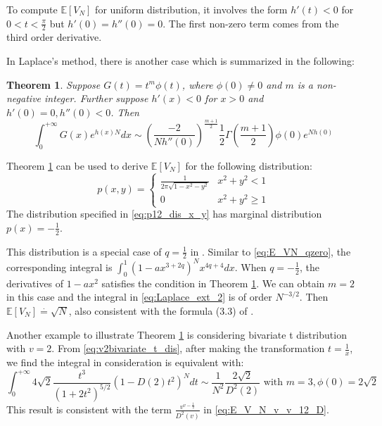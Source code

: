 \documentclass{article}
\newtheorem{theorem}{Theorem}
\def\E{\mathbb{E}}
\begin{document}
To compute $\E[V_N]$ for uniform distribution,
it involves the form $h'(t)<0$ for $0<t<\frac{\pi}{2}$
but $h'(0)=h''(0)=0$. The first non-zero term comes from
the third order derivative.

In Laplace's method, there is another case which is summarized in the following:
\begin{theorem}\label{thm:second_derivative_laplace}
    Suppose $G(t) = t^{m} \phi(t)$, where $\phi(0)\neq 0$
    and $m$ is a non-negative integer.
    Further suppose $h'(x)<0$ for $x> 0$ and $h'(0)=0, h''(0)<0$.
    Then
    \begin{equation}\label{eq:Laplace_ext_2}
        \int_0^{+\infty} G(x) e^{h(x)N} dx
        \sim \left(\frac{-2}{N h''(0)}\right)^{\frac{m+1}{2}}
        \frac{1}{2}\Gamma\left(\frac{m+1}{2} \right)
        \phi(0)e^{Nh(0)}     
    \end{equation}
\end{theorem}
Theorem \ref{thm:second_derivative_laplace}
can be used to derive $\E[V_N]$ for the following
distribution:
\begin{equation}\label{eq:p12_dis_x_y}
    p(x,y) =\begin{cases} 
        \frac{1}{2\pi \sqrt{1-x^2-y^2}} & x^2+y^2<1 \\
        0 & x^2 + y^2 \geq 1
    \end{cases}
\end{equation}
The distribution specified in \eqref{eq:p12_dis_x_y}
has marginal distribution $p(x)=-\frac{1}{2}$.

This distribution is a special case of $q=\frac{1}{2}$
in \cite{affentranger1991convex}.
Similar to \eqref{eq:E_VN_qzero},
the corresponding
integral is $\int_0^1 (1-a x^{3+2q})^N x^{4q+4} dx$.
When $q=-\frac{1}{2}$, the derivatives of $1-ax^2$
satisfies the condition in Theorem \ref{thm:second_derivative_laplace}.
We can obtain $m=2$ in this case and the integral
in \eqref{eq:Laplace_ext_2} is of order $N^{-3/2}$.
Then $\E[V_N] \stackrel{\cdot}{=} \sqrt{N}$,
also consistent with the formula (3.3) of \cite{affentranger1991convex}.

Another example to illustrate Theorem \ref{thm:second_derivative_laplace}
is considering bivariate t distribution with $v=2$.
From \eqref{eq:v2bivariate_t_dis},
after making the transformation
$t=\frac{1}{x}$,
we find the integral in consideration is equivalent with:
\begin{equation}
    \int_{0}^{+\infty}
    4\sqrt{2} \frac{t^3}{(1+2t^2)^{5/2}}
    (1-D(2)t^2)^N dt
    \sim \frac{1}{N^2}\frac{2\sqrt{2}}{D^2(2)}
    \textrm { with } m=3, \phi(0)=2\sqrt{2}
\end{equation}
This result is consistent with the term 
$\frac{v^{v-\frac{1}{2}}}{D^2(v)}$
in \eqref{eq:E_V_N_v_v_12_D}.
\end{document}
